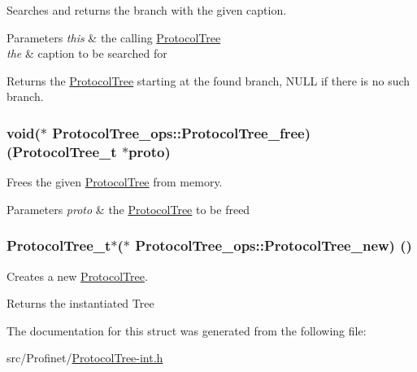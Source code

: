 Searches and returns the branch with the given caption. 


\begin{DoxyParams}{Parameters}
{\em this} & the calling \hyperlink{struct_protocol_tree}{Protocol\+Tree} \\
\hline
{\em the} & caption to be searched for\\
\hline
\end{DoxyParams}
\begin{DoxyReturn}{Returns}
the \hyperlink{struct_protocol_tree}{Protocol\+Tree} starting at the found branch, N\+U\+L\+L if there is no such branch. 
\end{DoxyReturn}
\hypertarget{struct_protocol_tree__ops_a23049a430e1176244701e816713b0795}{}
\subsubsection[{Protocol\+Tree\+\_\+free}]{\setlength{\rightskip}{0pt plus 5cm}void($\ast$ Protocol\+Tree\+\_\+ops\+::\+Protocol\+Tree\+\_\+free) (Protocol\+Tree\+\_\+t $\ast$proto)}\label{struct_protocol_tree__ops_a23049a430e1176244701e816713b0795}


Frees the given \hyperlink{struct_protocol_tree}{Protocol\+Tree} from memory. 


\begin{DoxyParams}{Parameters}
{\em proto} & the \hyperlink{struct_protocol_tree}{Protocol\+Tree} to be freed \\
\hline
\end{DoxyParams}
\hypertarget{struct_protocol_tree__ops_aba9d5a98ad9e37f9f813d7e09a77e7f3}{}
\subsubsection[{Protocol\+Tree\+\_\+new}]{\setlength{\rightskip}{0pt plus 5cm}Protocol\+Tree\+\_\+t$\ast$($\ast$ Protocol\+Tree\+\_\+ops\+::\+Protocol\+Tree\+\_\+new) ()}\label{struct_protocol_tree__ops_aba9d5a98ad9e37f9f813d7e09a77e7f3}


Creates a new \hyperlink{struct_protocol_tree}{Protocol\+Tree}. 

\begin{DoxyReturn}{Returns}
the instantiated Tree 
\end{DoxyReturn}


The documentation for this struct was generated from the following file\+:\begin{DoxyCompactItemize}
\item 
src/\+Profinet/\hyperlink{_protocol_tree-int_8h}{Protocol\+Tree-\/int.\+h}\end{DoxyCompactItemize}

